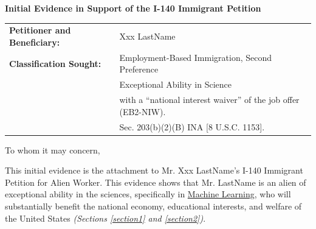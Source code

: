 \documentclass[11pt]{article}
\begin{document}
\sloppy


\vspace{4em}


\begin{center}
 \Large{\textbf{Initial Evidence in Support of the I-140 Immigrant Petition}}
\end{center}

\vspace{4em}


\begin{tabular}{ll}
\textbf{Petitioner and Beneficiary:} & Xxx LastName\\
\textbf{Classification Sought:} & Employment-Based Immigration, Second Preference\\
& Exceptional Ability in Science \\
& with a “national interest waiver” of the job offer (EB2-NIW).\\
& Sec. 203(b)(2)(B) INA [8 U.S.C. 1153].\\
\end{tabular}

\vspace{2em}


To whom it may concern,

\vspace{2em}



\newcommand{\fie}{Machine Learning}
\newcommand{\dr}{Mr. LastName }
\newcommand{\drs}{Mr. LastName's }



\newcommand{\referrerA}{(Name, Title, Institution\\}
\newcommand{\referrerB}{(Name, Title, Institution\\}



This initial evidence is the attachment to Mr. Xxx LastName’s I-140 Immigrant Petition for Alien Worker. This evidence shows that Mr. LastName is an alien of exceptional ability in the sciences, specifically in \underline{\fie{}}, who will substantially benefit the national economy, educational interests, and welfare of the United States \textit{(Sections \ref{section1} and \ref{section2})}. \\
\end{document}
